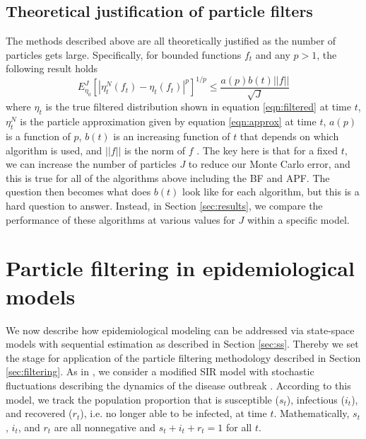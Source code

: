 \documentclass{elsarticle}
\begin{document}
\subsection{Theoretical justification of particle filters}

The methods described above are all theoretically justified as the number of particles gets large. Specifically, for bounded functions $f_t$ and any $p>1$, the following result holds
\[ E_{\eta_0}^J \left[ \left| \eta_t^N(f_t)-\eta_t(f_t)\right|^p\right]^{1/p} \le \frac{a(p) b(t) ||f||}{\sqrt{J}} \]
where $\eta_t$ is the true filtered distribution shown in equation \eqref{eqn:filtered} at time $t$, $\eta_t^N$ is the particle approximation given by equation \eqref{eqn:approx} at time $t$, $a(p)$ is a function of $p$, $b(t)$ is an increasing function of $t$  that depends on which algorithm is used, and $||f||$ is the norm of $f$ \cite[][see Sec 3.5.1]{del2004feynman}. The key here is that for a fixed $t$, we can increase the number of particles $J$ to reduce our Monte Carlo error, and this is true for all of the algorithms above including the BF and APF. The question then becomes what does $b(t)$ look like for each algorithm, but this is a hard question to answer. Instead, in Section \ref{sec:results}, we compare the performance of these algorithms at various values for $J$ within a specific model.

\section{Particle filtering in epidemiological models \label{sec:apply}}

We now describe how epidemiological modeling can be addressed via state-space models with sequential estimation as described in Section \ref{sec:ss}. Thereby we set the stage for application of the particle filtering methodology described in Section \ref{sec:filtering}. As in \citet{skvortsov2012monitoring}, we consider a modified SIR model with stochastic fluctuations describing the dynamics of the disease outbreak \citep{herwaarden1995stochepid, dangerfield2009stochepid, anderson2004sars}. According to this model, we track the population proportion that is susceptible ($s_t$), infectious ($i_t$), and recovered ($r_t$), i.e. no longer able to be infected, at time $t$. Mathematically, $s_t$, $i_t$, and $r_t$ are all nonnegative and $s_t + i_t + r_t = 1$ for all $t$.
\end{document}
